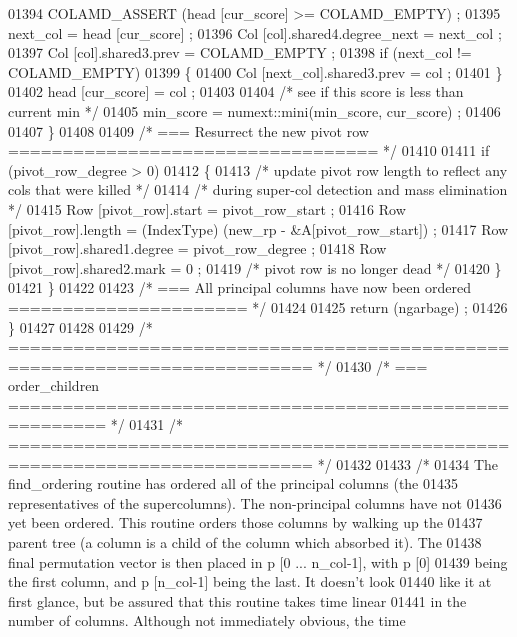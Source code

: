 \begin{DoxyCode}
{{{{{{{{{{{{{{{{{{{{{{{{{{{{01394       COLAMD\_ASSERT (head [cur\_score] >= COLAMD\_EMPTY) ;
01395       next\_col = head [cur\_score] ;
01396       Col [col].shared4.degree\_next = next\_col ;
01397       Col [col].shared3.prev = COLAMD\_EMPTY ;
01398       \textcolor{keywordflow}{if} (next\_col != COLAMD\_EMPTY)
01399       \{
01400     Col [next\_col].shared3.prev = col ;
01401       \}
01402       head [cur\_score] = col ;
01403 
01404       \textcolor{comment}{/* see if this score is less than current min */}
01405       min\_score = numext::mini(min\_score, cur\_score) ;
01406 
01407     \}
01408 
01409     \textcolor{comment}{/* === Resurrect the new pivot row ================================== */}
01410 
01411     \textcolor{keywordflow}{if} (pivot\_row\_degree > 0)
01412     \{
01413       \textcolor{comment}{/* update pivot row length to reflect any cols that were killed */}
01414       \textcolor{comment}{/* during super-col detection and mass elimination */}
01415       Row [pivot\_row].start  = pivot\_row\_start ;
01416       Row [pivot\_row].length = (IndexType) (new\_rp - &A[pivot\_row\_start]) ;
01417       Row [pivot\_row].shared1.degree = pivot\_row\_degree ;
01418       Row [pivot\_row].shared2.mark = 0 ;
01419       \textcolor{comment}{/* pivot row is no longer dead */}
01420     \}
01421   \}
01422 
01423   \textcolor{comment}{/* === All principal columns have now been ordered ====================== */}
01424 
01425   \textcolor{keywordflow}{return} (ngarbage) ;
01426 \}
01427 
01428 
01429 \textcolor{comment}{/* ========================================================================== */}
01430 \textcolor{comment}{/* === order\_children ======================================================= */}
01431 \textcolor{comment}{/* ========================================================================== */}
01432 
01433 \textcolor{comment}{/*}
01434 \textcolor{comment}{  The find\_ordering routine has ordered all of the principal columns (the}
01435 \textcolor{comment}{  representatives of the supercolumns).  The non-principal columns have not}
01436 \textcolor{comment}{  yet been ordered.  This routine orders those columns by walking up the}
01437 \textcolor{comment}{  parent tree (a column is a child of the column which absorbed it).  The}
01438 \textcolor{comment}{  final permutation vector is then placed in p [0 ... n\_col-1], with p [0]}
01439 \textcolor{comment}{  being the first column, and p [n\_col-1] being the last.  It doesn't look}
01440 \textcolor{comment}{  like it at first glance, but be assured that this routine takes time linear}
01441 \textcolor{comment}{  in the number of columns.  Although not immediately obvious, the time}
}}}}}}}}}}}}}}}}}}}}}}}}}}}}
\end{DoxyCode}
